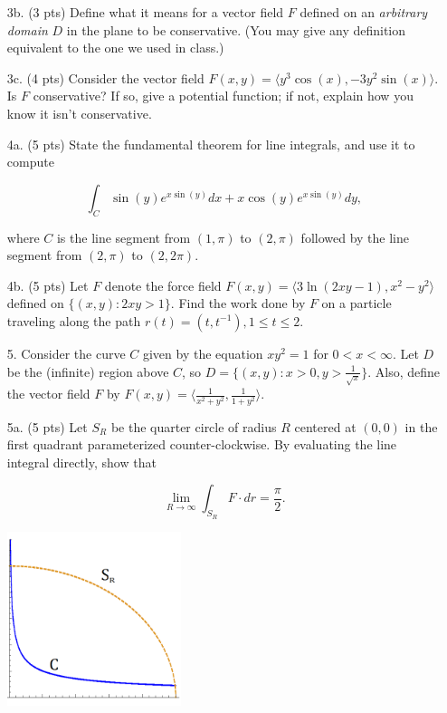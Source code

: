 \documentclass[12 pt]{report}
\begin{document}
\begin{enumerate}
\item[3b.] (3 pts) Define what it means for a vector field $F$ defined on an \emph{arbitrary domain} $D$ in the plane to be conservative. (You may give any definition equivalent to the one we used in class.)

\vspace{4cm}

\item[3c.] (4 pts) Consider the vector field $F(x,y) = \langle y^3 \cos(x), - 3y^2 \sin(x) \rangle$. Is $F$ conservative? If so, give a potential function; if not, explain how you know it isn't conservative. 

\newpage

\item[4a.] (5 pts) State the fundamental theorem for line integrals, and use it to compute 

$$\int_C \sin(y) e^{x \sin(y)} dx + x \cos(y) e^{x \sin(y)} dy,$$

where $C$ is the line segment from $(1,\pi)$ to $(2,\pi)$ followed by the line segment from $(2,\pi)$ to $(2,2 \pi)$. 

\vspace{7cm}  

\item[4b.] (5 pts) Let $F$ denote the force field $F(x,y) = \langle 3 \ln (2xy-1), x^2-y^2 \rangle$ defined on $\{(x,y): 2xy > 1 \}$. Find the work done by $F$ on a particle traveling along the path $r(t) = (t, t^{-1}), 1 \leq t \leq 2$. 


\newpage

\item[5.] Consider the curve $C$ given by the equation $xy^2 = 1$ for $0 < x < \infty$. Let $D$ be the (infinite) region above $C$, so $D = \{(x,y): x > 0, y > \frac{1}{\sqrt{x}} \}$. Also, define the vector field $F$ by $F(x,y) = \langle \frac{1}{x^2+y^2}, \frac{1}{1+y^2} \rangle$. 

\item[5a.] (5 pts) Let $S_R$ be the quarter circle of radius $R$ centered at $(0,0)$ in the first quadrant parameterized counter-clockwise. By evaluating the line integral directly, show that

$$\lim_{R \to \infty} \int_{S_R} F \cdot dr = \frac{\pi}{2}.$$ 

\flushleft \includegraphics[width=2in]{midterm2s2016_problem_5.png}


\end{enumerate}
\end{document}
